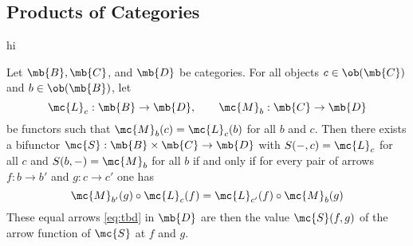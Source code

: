 \documentclass[nocover]{pset}
\begin{document}
\begin{adjustwidth}{1em}{1em}
  \subsection{Products of Categories}
  hi
  \begin{theorem}
    Let $\mb{B}, \mb{C}$, and $\mb{D}$ be categories. For all objects
    $c \in \ob(\mb{C})$ and $b \in \ob(\mb{B})$, let
    \[
      \mc{L}_{c} : \mb{B} \to \mb{D}, \qquad \mc{M}_b : \mb{C} \to
      \mb{D}
    \]
    be functors such that $\mc{M}_b(c) = \mc{L}_c(b)$ for all $b$ and
    $c$. Then there exists a bifunctor $\mc{S} : \mb{B} \times \mb{C}
    \to \mb{D}$ with $S(-, c) = \mc{L}_c$ for all $c$ and $S(b, -) =
    \mc{M}_b$ for all $b$ if and only if for every pair of arrows $f :
    b \to b'$ and $g : c \to c'$ one has
    \begin{equation}
      \mc{M}_{b'}(g) \circ \mc{L}_c(f) = \mc{L}_{c'}(f) \circ
      \mc{M}_b(g) \label{eq:tbd}
    \end{equation}
    These equal arrows \ref{eq:tbd} in $\mb{D}$ are then the value
    $\mc{S}(f,g)$ of the arrow function of $\mc{S}$ at $f$ and $g$.
  \end{theorem}
\end{adjustwidth}
\end{document}
